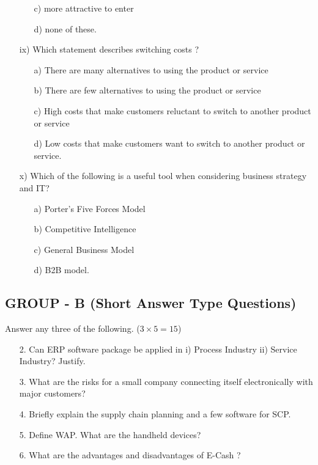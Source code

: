 \begin{enumerate}
\begin{enumerate}
        \item[c)] more attractive to enter
        \item[d)] none of these.
    \end{enumerate}
    \item[ix)] Which statement describes switching costs ?
    \begin{enumerate}
        \item[a)] There are many alternatives to using the product or service
        \item[b)] There are few alternatives to using the product or service
        \item[c)] High costs that make customers reluctant to switch to another product or service
        \item[d)] Low costs that make customers want to switch to another product or service.
    \end{enumerate}
    \item[x)] Which of the following is a useful tool when considering business strategy and IT?
    \begin{enumerate}
        \item[a)] Porter's Five Forces Model
        \item[b)] Competitive Intelligence
        \item[c)] General Business Model
        \item[d)] B2B model.
    \end{enumerate}
\end{enumerate}

\subsection*{GROUP - B (Short Answer Type Questions)}
Answer any three of the following. ($3 \times 5 = 15$)
\begin{enumerate}
    \item[2.] Can ERP software package be applied in 
    i) Process Industry 
    ii) Service Industry? 
    Justify.
    \item[3.] What are the risks for a small company connecting itself electronically with major customers?
    \item[4.] Briefly explain the supply chain planning and a few software for SCP.
    \item[5.] Define WAP. What are the handheld devices?
    \item[6.] What are the advantages and disadvantages of E-Cash ?
\end{enumerate}

